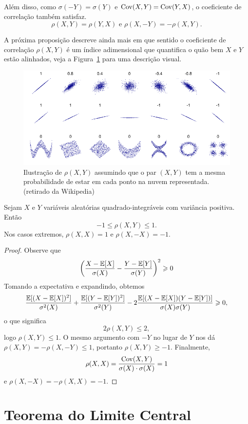 Além disso, como $\sigma(-Y) = \sigma(Y)$ e $\mathrm{Cov}(X, Y) = \mathrm{Cov}(Y, X)$, o coeficiente de correlação também satisfaz.
\[
\rho(X, Y) = \rho(Y, X)
\text{ e }
\rho(X, -Y) = -\rho(X, Y)
.
\]

A próxima proposição descreve ainda mais em que sentido o coeficiente de correlação $\rho(X, Y)$ é um índice adimensional que quantifica o quão bem $X$ e $Y$ estão alinhados, veja a Figura~\ref{fig:Correlation_examples2} para uma descrição visual.

\begin{figure}[b!]
\includegraphics[width=\textwidth]{Pictures/Correlation_examples2}
\caption{Ilustração de $ \rho(X,Y) $ assumindo que o par $ (X, Y) $ tem a mesma probabilidade de estar em cada ponto na nuvem representada. \hfill (retirado da Wikipedia)}
\label{fig:Correlation_examples2}
\end{figure}

\begin{proposition*}
Sejam $X$ e $Y$ variáveis aleatórias quadrado-integráveis com variância positiva.
Então
\[
-1 \le \rho(X, Y) \le 1
.
\]
Nos casos extremos, $\rho(X, X) = 1$ e $\rho(X, -X) = -1$.
\end{proposition*}
\begin{proof}
Observe que
\[
\left(\frac{X-\mathbb{E}[X]}{\sigma(X)} - \frac{Y-\mathbb{E}[Y]}{\sigma(Y)}\right)^2\geqslant 0
\]
Tomando a expectativa e expandindo, obtemos
\[
\frac{\mathbb{E}[(X-\mathbb{E}[X])^2]}{\sigma^2(X)} + \frac{\mathbb{E}[(Y-\mathbb{E}[Y])^2]}{\sigma^2(Y)} - 2\frac{\mathbb{E}[(X-\mathbb{E}[X])(Y-\mathbb{E}[Y])]}{\sigma(X)\sigma(Y)}
\geqslant
0
,
\]
o que significa
\[
2 \rho(X,Y) \leq 2,
\]
logo
$ \rho(X,Y) \leq 1 $.
O mesmo argumento com $ -Y $ no lugar de $ Y $ nos dá $ \rho(X,Y) = -\rho(X,-Y) \leq 1 $, portanto
$ \rho(X,Y) \geq -1 $.
Finalmente,
\[
\rho(X,X) = \frac{\mathrm{Cov}(X,Y)}{\sigma(X)\cdot\sigma(X)} = 1
\]
e $ \rho(X,-X) = - \rho(X,X) = -1 $.
\end{proof}

\clearpage
\section{Teorema do Limite Central}

